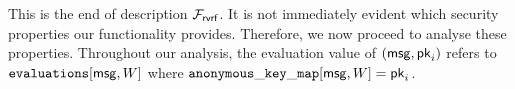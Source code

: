 	
	
	This is the end of description $ \mathcal{F}_{\textsf{rvrf}} $.  It is not immediately evident which security properties our functionality provides. Therefore, we  now proceed to analyse these properties. Throughout our analysis,  the evaluation value of $ (\mathsf{msg}, \mathsf{pk}_i) $ refers to $ \texttt{evaluations}[\mathsf{msg},W] $ where $ \mathtt{anonymous\_key\_map}[\mathsf{msg},W] = \mathsf{pk}_i $.
	

